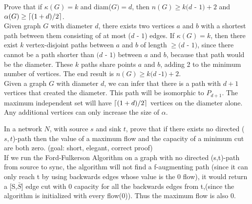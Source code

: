 \documentclass[12pt]{article}
\DeclarePairedDelimiter{\ceil}{\lceil}{\rceil}
\newenvironment{question}[2][Question]{\begin{trivlist}
\item[\hskip \labelsep {\bfseries #1}\hskip \labelsep {\bfseries #2.}]}{\end{trivlist}}
\begin{document}
\begin{question}{8}
Prove that if $\kappa(G) = k$ and diam($G) = d$, then $n(G) \geq k(d$ - $ 1) + 2$ and $\alpha(G) \geq \ceil[big]{(1 + d)/2}$.
\\
Given graph $G$ with diameter $d$, there exists two vertices $a$ and $b$ with a shortest path between them consisting of at most ($d$ - $1$) edges.  If $\kappa(G) = k$, then there exist $k$ vertex-disjoint paths between $a$ and $b$ of length $\geq (d$ - $1)$, since there cannot be a path shorter than $(d$ - $1)$ between $a$ and $b$, because that path would be the diameter.  These $k$ paths share points $a$ and $b$, adding 2 to the minimum number of vertices.  The end result is $n(G) \geq k(d$ -$1) +2$.  \\

\noindent
Given a graph $G$ with diameter $d$, we can infer that there is a path with $d+1$ vertices that created the diameter.  This path will be isomorphic to $P_{d+1}$.  The maximum independent set will have $\ceil[big]{(1 + d)/2}$ vertices on the diameter alone.  Any additional vertices can only increase the size of $\alpha$.



\end{question}

\begin{question}{9}
In a network $N$, with source $s$ and sink $t$, prove that if there exists no directed ($s, t$)-path then the value of a maximum flow and the capacity of a minimum cut are both zero. (goal: short, elegant, correct proof) \\

If we run the Ford-Fulkerson Algorithm on a graph with no directed (s,t)-path from source to sync, the algorithm will not find a f-augmenting path (since it can only reach t by using backwards edges whose value is the 0 flow), it would return a [S,$\bar{S}$] edge cut with 0 capacity for all the backwards edges from t,(since the algorithm is initialized with every flow(0)). Thus the maximum flow is also 0.
\end{question}
\end{document}
